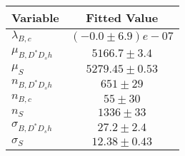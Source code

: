 \begin{tabular}[t]{lc}
\hline
Variable &Fitted Value\\
\hline\hline
$\lambda_{B,c}$&$(-0.0\pm6.9)e-07$\\
\hline
$\mu_{B, D^* D_s h}$&$5166.7\pm3.4$\\
\hline
$\mu_S$&$5279.45\pm0.53$\\
\hline
$n_{B, D^* D_s h}$&$651\pm29$\\
\hline
$n_{B,c}$&$55\pm30$\\
\hline
$n_S$&$1336\pm33$\\
\hline
$\sigma_{B, D^* D_s h}$&$27.2\pm2.4$\\
\hline
$\sigma_S$&$12.38\pm0.43$\\
\hline
\end{tabular}